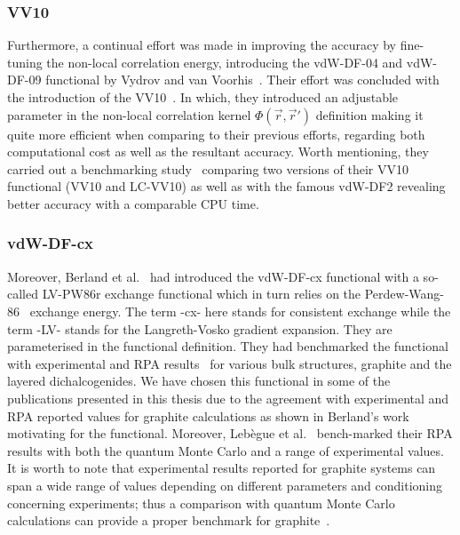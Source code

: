 \subsubsection{VV10}
Furthermore, a continual effort was made in improving the accuracy by fine-tuning the non-local correlation energy, introducing the vdW-DF-04 and vdW-DF-09 functional by Vydrov and van Voorhis~\cite{Oleg2009improving, Vydrov2009, Vydrov2010dispersion}. Their effort was concluded with the introduction of the VV10~\cite{Oleg2010}. In which, they introduced an adjustable parameter in the non-local correlation kernel $\Phi(\vec{r},\vec{r}')$ definition making it quite more efficient when comparing to their previous efforts, regarding both computational cost as well as the resultant accuracy. Worth mentioning, they carried out a benchmarking study~\cite{Vydrov2012benchmarking} comparing two versions of their VV10 functional (VV10 and LC-VV10) as well as with the famous vdW-DF2 revealing better accuracy with a comparable CPU time.
\subsubsection{vdW-DF-cx}
Moreover, Berland et al.~\cite{Berland2014vdWxc} had introduced the vdW-DF-cx functional with a so-called LV-PW86r exchange functional which in turn relies on the Perdew-Wang-86~\cite{Perdew1986, Murray2009} exchange energy. The term -cx- here stands for consistent exchange while the term -LV- stands for the Langreth-Vosko gradient expansion. They are parameterised in the functional definition. They had benchmarked the functional with experimental and RPA results~\cite{Bjorkman2012PRL, Bjorkman2012areWeReady} for various bulk structures, graphite and the layered dichalcogenides. We have chosen this functional in some of the publications presented in this thesis due to the agreement with experimental and RPA reported values for graphite calculations as shown in Berland's work~\cite{Berland2014vdWxc} motivating for the functional. Moreover, Lebègue et al.~\cite{Lebegue2010PRL} bench-marked their RPA results with both the quantum Monte Carlo and a range of experimental values. It is worth to note that experimental results reported for graphite systems can span a wide range of values depending on different parameters and conditioning concerning experiments; thus a comparison with quantum Monte Carlo calculations can provide a proper benchmark for graphite~\cite{Spanu2009PRL}.
